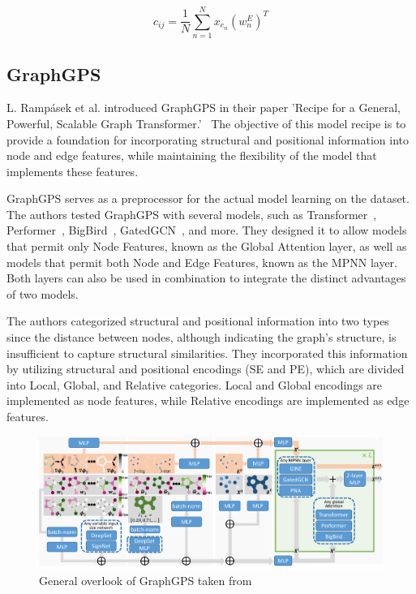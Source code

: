 \begin{equation}
    c_{ij} = \frac{1}{N} \sum_{n=1}^{N} x_{e_n}(w_n^E)^T
    \label{eqn:bias_2}
\end{equation}

\subsection{GraphGPS}
\label{sec:graphgps}
L. Rampásek et al. introduced GraphGPS in their paper 'Recipe for a General, Powerful, Scalable Graph Transformer.'~\cite{2023graphgps} The objective of this model recipe is to provide a foundation for incorporating structural and positional information into node and edge features, while maintaining the flexibility of the model that implements these features.

GraphGPS serves as a preprocessor for the actual model learning on the dataset. The authors tested GraphGPS with several models, such as Transformer~\cite{vaswani2017attention}, Performer~\cite{choromanski2022performer}, BigBird~\cite{zaheer2021bigbird}, GatedGCN~\cite{bresson2018GatedGCN}, and more. They designed it to allow models that permit only Node Features, known as the Global Attention layer, as well as models that permit both Node and Edge Features, known as the MPNN layer. Both layers can also be used in combination to integrate the distinct advantages of two models.

The authors categorized structural and positional information into two types since the distance between nodes, although indicating the graph's structure, is insufficient to capture structural similarities. They incorporated this information by utilizing structural and positional encodings (SE and PE), which are divided into Local, Global, and Relative categories. Local and Global encodings are implemented as node features, while Relative encodings are implemented as edge features.

\begin{figure}[h!]
    \centering
    \includegraphics[scale=0.13]{tex/res/gps_abstract.png}
    \caption{General overlook of GraphGPS taken from~\cite{2023graphgps}}
    \label{fig:gps-abstract}
\end{figure}

